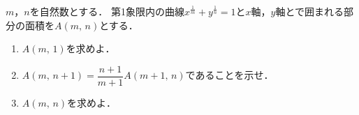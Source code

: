 \documentclass[../../main.tex]{subfiles}
\begin{document}
$m$，$n$を自然数とする．
第1象限内の曲線$x^{\frac{1}{m}}+y^{\frac{1}{n}}=1$と$x$軸，$y$軸とで囲まれる部分の面積を$A(m, \, n)$とする．
\begin{enumerate}
  \item $A(m, \, 1)$を求めよ．
  \item $\displaystyle A(m, \, n+1)=\dfrac{n+1}{m+1}A(m+1, \, n)$であることを示せ．
  \item $A(m, \, n)$を求めよ．
\end{enumerate}
\end{document}
